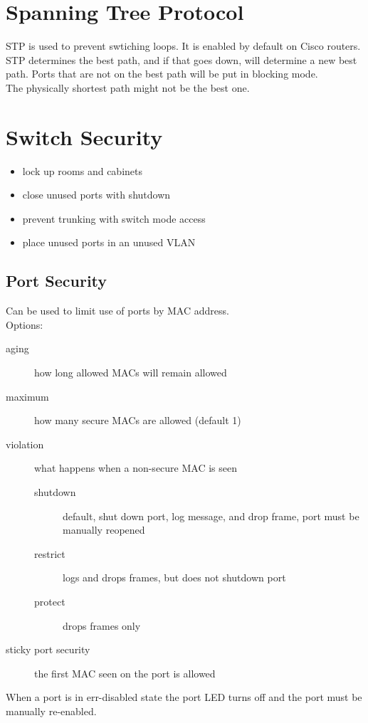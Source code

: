 \documentclass{article}
\begin{document}
\section{Spanning Tree Protocol}

STP is used to prevent swtiching loops. It is enabled by default on Cisco
routers.\\

STP determines the best path, and if that goes down, will determine a new best
path. Ports that are not on the best path will be put in blocking mode.\\

The physically shortest path might not be the best one.

\section{Switch Security}

\begin{itemize}

\item lock up rooms and cabinets
\item close unused ports with shutdown
\item prevent trunking with switch mode access
\item place unused ports in an unused VLAN

\end{itemize}

\subsection{Port Security}

Can be used to limit use of ports by MAC address.\\

Options:

\begin{description}

\item[aging]
how long allowed MACs will remain allowed

\item[maximum]
how many secure MACs are allowed (default 1)

\item[violation]
what happens when a non-secure MAC is seen

\begin{description}

\item[shutdown]
default, shut down port, log message, and drop frame, port must be manually
reopened

\item[restrict]
logs and drops frames, but does not shutdown port

\item[protect]
drops frames only

\end{description}

\end{description}

\begin{description}

\item[sticky port security]
the first MAC seen on the port is allowed

\end{description}

When a port is in err-disabled state the port LED turns off and the port
must be manually re-enabled.
\end{document}
